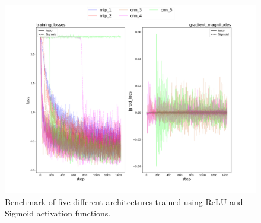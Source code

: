 \documentclass{assignment}
\begin{document}
\begin{figure}[!htb]
    \centering
    \includegraphics[width=1\textwidth]{figures/part4_alpha.png}
    \caption{Benchmark of five different architectures trained using ReLU and Sigmoid activation functions.}
    \label{fig:q4}
\end{figure}
\end{document}
